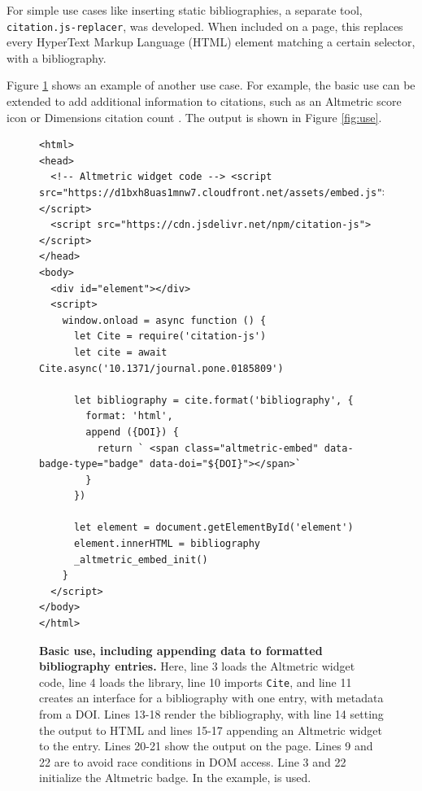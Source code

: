 \documentclass[fleqn,10pt,lineno]{wlpeerj} %
\begin{document}
For simple use cases like inserting static bibliographies, a separate tool, \texttt{citation.js-replacer}, was developed. When included on a page, this replaces every HyperText Markup Language (HTML) element matching a certain selector, with a bibliography.

Figure \ref{code:use} shows an example of another use case. For example, the basic use can be extended to add additional information to citations, such as an Altmetric \citep{adie_altmetric:_2013} score icon or Dimensions citation count \citep{thelwall_dimensions:_2018}. The output is shown in Figure \ref{fig:use}.

\begin{figure}[bt!]
\centering
\begin{small}
\begin{verbatim}
<html>
<head>
  <!-- Altmetric widget code --> <script src="https://d1bxh8uas1mnw7.cloudfront.net/assets/embed.js"></script>
  <script src="https://cdn.jsdelivr.net/npm/citation-js"></script>
</head>
<body>
  <div id="element"></div>
  <script>
    window.onload = async function () {
      let Cite = require('citation-js')
      let cite = await Cite.async('10.1371/journal.pone.0185809')
      
      let bibliography = cite.format('bibliography', {
        format: 'html',
        append ({DOI}) {
          return ` <span class="altmetric-embed" data-badge-type="badge" data-doi="${DOI}"></span>`
        }
      })
    
      let element = document.getElementById('element')
      element.innerHTML = bibliography
      _altmetric_embed_init()
    }
  </script>
</body>
</html>
\end{verbatim}
\end{small}
\caption{\textbf{Basic use, including appending data to formatted bibliography entries.}
Here, line 3 loads the Altmetric widget code, line 4 loads the library, line 10 imports \texttt{Cite}, and line 11 creates an interface for a bibliography with one entry, with metadata from a DOI. Lines 13-18 render the bibliography, with line 14 setting the output to HTML and lines 15-17 appending an Altmetric widget to the entry. Lines 20-21 show the output on the page. Lines 9 and 22 are to avoid race conditions in DOM access. Line 3 and 22 initialize the Altmetric badge. In the example, \citep{hallmann_more_2017} is used.
}
\label{code:use}
\end{figure}
\end{document}
